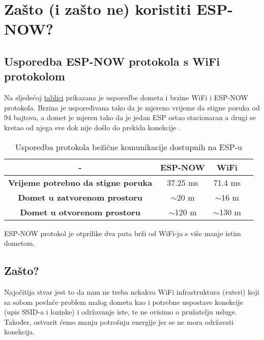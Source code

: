 \documentclass[seminarskirad]{fer}
\begin{document}
\section{Zašto (i zašto ne) koristiti ESP-NOW?}

\subsection{Usporedba ESP-NOW protokola s WiFi protokolom}

Na sljedećoj \hyperref[tab:tablica]{tablici} prikazana je usporedbe dometa i brzine WiFi i ESP-NOW protokola. Brzina je uspoređivana tako da je mjereno vrijeme da stigne poruka od 94 bajtova, a domet je mjeren tako da je jedan ESP ostao stacionaran a drugi se kretao od njega sve dok nije došlo do prekida konekcije\footnotemark{} .

\begin{table}[h!]
    \centering
    \begin{tabular}{|c|c|c|c|} 
     \hline
     - & \textbf{ESP-NOW} & \textbf{WiFi} \\
     \hline
     \textbf{Vrijeme potrebno da stigne poruka} & 37.25 ms & 71.4 ms\\ 
     \hline
     \textbf{Domet u zatvorenom prostoru} & $\sim$20 m &  $\sim$16 m\\
     \hline
     \textbf{Domet u otvorenom prostoru} & $\sim$120 m & $\sim$130 m\\
     \hline
    \end{tabular}
    \caption{Usporedba protokola bežične komunikacije dostupnih na ESP-u}
    \label{tab:tablica}
\end{table}

ESP-NOW protokol je otprilike dva puta brži od WiFi-ja s više manje istim dometom.

\subsection{Zašto?}

Najočitija stvar jest to da nam ne treba nekakva WiFi infrastruktura (ruteri) koji sa sobom povlače problem malog dometa kao i potrebne uspostave konekcije (upis SSID-a i lozinke) i održavanje iste, te ne ovisimo o pružatelju usluge. Također, ostvarit ćemo manju potrošnju energije jer se ne mora održavati konekcija.
\end{document}
